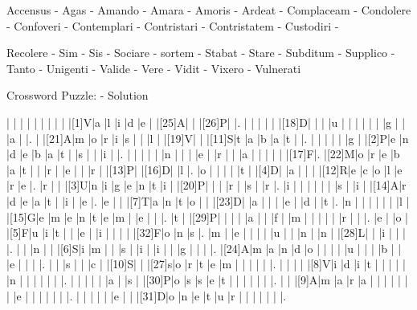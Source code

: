 \documentclass[12pt]{article}
\begin{document}
\noindent\begin{rotate}{90}
\small Accensus - Agas - Amando - Amara - Amoris - Ardeat - Complaceam - Condolere - Confoveri - Contemplari - Contristari - Contristatem - Custodiri -
\end{rotate}
\small  Recolere - Sim - Sis - Sociare - sortem - Stabat - Stare - Subditum - Supplico - Tanto - Unigenti - Valide - Vere - Vidit - Vixero - Vulnerati 
\newpage
\begin{center}
  \huge{Crossword Puzzle: - Solution}
\end{center}
\vspace{1.5cm}
\PuzzleSolution
\begin{Puzzle}{22}{22}
  |{}  |{}  |{}  |{}  |{}  |{}  |{}  |{}  |{}  |[1]V|a   |l   |i   |d   |e   |{}  |[25]A|{}  |{}  |[26]P|{}  |.
  |{}  |{}  |{}  |{}  |{}  |[18]D|{}  |{}  |{}  |u   |{}  |{}  |{}  |{}  |{}  |{}  |g   |{}  |{}  |a   |{}  |.
  |{}  |[21]A|m   |o   |r   |i   |s   |{}  |{}  |l   |{}  |[19]V|{}  |{}  |[11]S|t   |a   |b   |a   |t   |{}  |.
  |{}  |{}  |{}  |{}  |{}  |g   |{}  |[2]P|e   |n   |d   |e   |b   |a   |t   |{}  |s   |{}  |{}  |i   |{}  |.
  |{}  |{}  |{}  |{}  |{}  |n   |{}  |{}  |{}  |e   |{}  |r   |{}  |{}  |a   |{}  |{}  |{}  |{}  |{}  |[17]F|.
  |[22]M|o   |r   |e   |b   |a   |t   |{}  |{}  |r   |{}  |e   |{}  |{}  |r   |{}  |[13]P|{}  |[16]D|{}  |l   |.
  |o   |{}  |{}  |{}  |{}  |t   |{}  |[4]D|{}  |a   |{}  |{}  |{}  |[12]R|e   |c   |o   |l   |e   |r   |e   |.
  |r   |{}  |{}  |[3]U|n   |i   |g   |e   |n   |t   |i   |{}  |[20]P|{}  |{}  |{}  |r   |{}  |s   |{}  |r   |.
  |i   |{}  |{}  |{}  |{}  |{}  |{}  |s   |{}  |i   |{}  |[14]A|r   |d   |e   |a   |t   |{}  |i   |{}  |e   |.
  |e   |{}  |{}  |[7]T|a   |n   |t   |o   |{}  |{}  |[23]D|{}  |a   |{}  |{}  |{}  |e   |{}  |d   |{}  |t   |.
  |n   |{}  |{}  |{}  |{}  |{}  |{}  |l   |{}  |[15]G|e   |m   |e   |n   |t   |e   |m   |{}  |e   |{}  |{}  |.
  |t   |{}  |[29]P|{}  |{}  |{}  |{}  |a   |{}  |{}  |f   |{}  |m   |{}  |{}  |{}  |{}  |{}  |r   |{}  |{}  |.
  |e   |{}  |o   |{}  |[5]F|u   |i   |t   |{}  |{}  |e   |{}  |i   |{}  |{}  |{}  |{}  |[32]F|o   |n   |s   |.
  |m   |{}  |e   |{}  |{}  |{}  |{}  |u   |{}  |{}  |n   |{}  |n   |{}  |[28]L|{}  |{}  |i   |{}  |{}  |{}  |.
  |{}  |{}  |n   |{}  |{}  |[6]S|i   |m   |{}  |{}  |s   |{}  |i   |{}  |i   |{}  |{}  |g   |{}  |{}  |{}  |.
  |[24]A|m   |a   |n   |d   |o   |{}  |{}  |{}  |{}  |u   |{}  |{}  |{}  |b   |{}  |{}  |e   |{}  |{}  |{}  |.
  |{}  |{}  |s   |{}  |{}  |c   |{}  |[10]S|{}  |{}  |[27]s|o   |r   |t   |e   |m   |{}  |{}  |{}  |{}  |{}  |.
  |{}  |{}  |{}  |{}  |[8]V|i   |d   |i   |t   |{}  |{}  |{}  |{}  |{}  |n   |{}  |{}  |{}  |{}  |{}  |{}  |.
  |{}  |{}  |{}  |{}  |{}  |a   |{}  |s   |{}  |[30]P|o   |s   |s   |e   |t   |{}  |{}  |{}  |{}  |{}  |{}  |.
  |{}  |{}  |[9]A|m   |a   |r   |a   |{}  |{}  |{}  |{}  |{}  |{}  |{}  |e   |{}  |{}  |{}  |{}  |{}  |{}  |.
  |{}  |{}  |{}  |{}  |{}  |e   |{}  |{}  |[31]D|o   |n   |e   |t   |u   |r   |{}  |{}  |{}  |{}  |{}  |{}  |.
\end{Puzzle}
\end{document}
